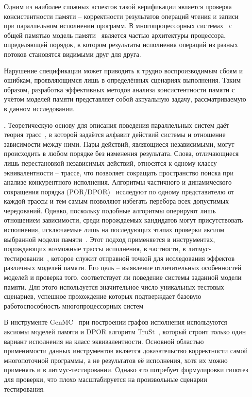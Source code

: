 Одним из наиболее сложных аспектов такой
верификации является проверка консистентности памяти -- корректности
результатов операций чтения и записи при параллельном исполнении программ.
В многопроцессорных системах~\cite{smp} с общей памятью модель
памяти~\cite{memory-model} является частью архитектуры процессора, определяющей
порядок, в котором результаты исполнения операций из разных потоков
становятся видимыми друг для друга.

Нарушение спецификации может приводить к трудно
воспроизводимым сбоям и ошибкам, проявляющимся лишь в
определённых сценариях выполнения.
Таким образом, разработка эффективных методов анализа консистентности
памяти с учётом моделей памяти представляет собой актуальную задачу,
рассматриваемую в данном исследовании.

{\progress}.
Теоретическую основу для описания поведения параллельных систем даёт
теория трасс~\cite{mazurkiewicz1986trace,mazurkiewicz1995introduction},
в которой задаётся алфавит действий системы и отношение
зависимости между ними.
Пары действий, являющиеся независимыми, могут
происходить в любом порядке без изменения результата.
Слова, отличающиеся лишь перестановкой независимых действий,
относятся к одному классу эквивалентности -- трассе, что позволяет
сокращать пространство поиска при анализе конкурентного исполнения.
Алгоритмы частичного и динамического сокращения порядка
(POR/DPOR)~\cite{flanagan2005dynamic,chockler2018computer}
исследуют по одному представителю от каждой трассы и
тем самым позволяют избегать перебора всех допустимых чередований.
Однако, поскольку подобные алгоритмы оперируют лишь отношением
зависимости, среди порождаемых кандидатов могут присутствовать
исполнения, исключаемые лишь на последующих этапах проверки аксиом
выбранной модели памяти~\cite{clarke1997model}.
Этот подход применяется в инструментах, порождающих возможные трассы
исполнения, в частности, в литмус-тестировании~\cite{litmus2},
которое служит отправной точкой для исследования эффектов различных
моделей памяти. Его цель -- выявление отличительных особенностей
моделей и проверка того, соответствует ли поведение системы заданной
модели памяти. Для этого используется значительное число уникальных
тестовых сценариев, успешное прохождение которых подтверждает базовую
работоспособность многопроцессорных систем

В инструменте GenMC~\cite{kokologiannakis2021genmc} при построении
графов исполнения используются аксиомы моделей памяти и DPOR алгоритм
TruSt~\cite{kokologiannakis2022truly}, который строит только один
вариант исполнения на класс эквивалентности.
Основной областью применимости данных инструментов является
доказательство корректности самой многопоточной программы, а не
результатов её исполнения,
хотя их можно применять и в литмус-тестировании. Однако это потребует
формулировки гипотез для проверки, что плохо масштабируется на
произвольные сценарии тестирования.

